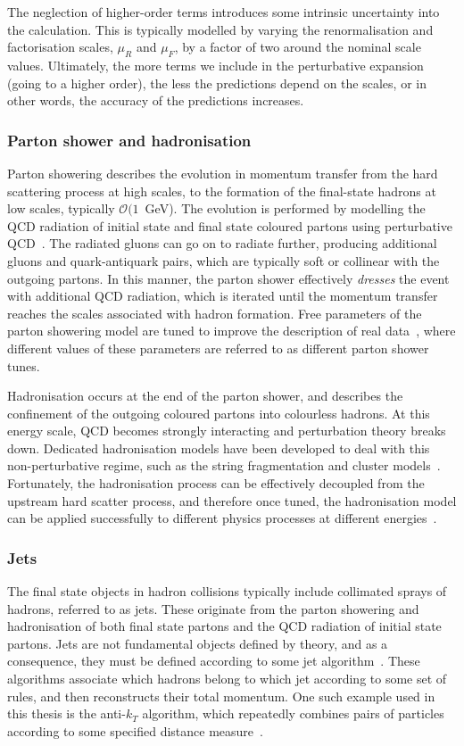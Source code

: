 The neglection of higher-order terms introduces some intrinsic uncertainty into the calculation. This is typically modelled by varying the renormalisation and factorisation scales, $\mu_R$ and $\mu_F$, by a factor of two around the nominal scale values.
Ultimately, the more terms we include in the perturbative expansion (going to a higher order), the less the predictions depend on the scales, or in other words, the accuracy of the predictions increases.

\subsubsection{Parton shower and hadronisation}
Parton showering describes the evolution in momentum transfer from the hard scattering process at high scales, to the formation of the final-state hadrons at low scales, typically $\mathcal{O}(1$~GeV). The evolution is performed by modelling the QCD radiation of initial state and final state coloured partons using perturbative QCD~\cite{}. The radiated gluons can go on to radiate further, producing additional gluons and quark-antiquark pairs, which are typically soft or collinear with the outgoing partons. In this manner, the parton shower effectively \textit{dresses} the event with additional QCD radiation, which is iterated until the momentum transfer reaches the scales associated with hadron formation. Free parameters of the parton showering model are tuned to improve the description of real data~\cite{}, where different values of these parameters are referred to as different parton shower tunes.

Hadronisation occurs at the end of the parton shower, and describes the confinement of the outgoing coloured partons into colourless hadrons. At this energy scale, QCD becomes strongly interacting and perturbation theory breaks down. Dedicated hadronisation models have been developed to deal with this non-perturbative regime, such as the string fragmentation and cluster models~\cite{}. Fortunately, the hadronisation process can be effectively decoupled from the upstream hard scatter process, and therefore once tuned, the hadronisation model can be applied successfully to different physics processes at different energies~\cite{}.

\subsubsection{Jets}
The final state objects in hadron collisions typically include collimated sprays of hadrons, referred to as jets. These originate from the parton showering and hadronisation of both final state partons and the QCD radiation of initial state partons. Jets are not fundamental objects defined by theory, and as a consequence, they must be defined according to some jet algorithm~\cite{Salam:2009jx}. These algorithms associate which hadrons belong to which jet according to some set of rules, and then reconstructs their total momentum. One such example used in this thesis is the anti-$k_T$ algorithm, which repeatedly combines pairs of particles according to some specified distance measure~\cite{Cacciari:2008gp}.

